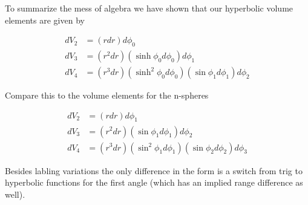 \documentclass{article}
\begin{document}
To summarize the mess of algebra we have shown that our hyperbolic volume elements are given by

\begin{align}
dV_2 &= \left(r dr\right) d\phi_0 \\
dV_3 &= \left(r^2 dr\right) \left(\sinh\phi_0 d\phi_0\right) d\phi_1 \\
dV_4 &= \left(r^3 dr\right) \left(\sinh^2 \phi_0 d\phi_0\right) \left(\sin\phi_1 d\phi_1\right) d\phi_2
\end{align}

Compare this to the volume elements for the n-spheres

\begin{align}
dV_2 &= \left(r dr\right) d\phi_1 \\
dV_3 &= \left(r^2 dr\right) \left(\sin\phi_1 d\phi_1\right) d\phi_2 \\
dV_4 &= \left(r^3 dr\right) \left(\sin^2\phi_1 d\phi_1\right) \left(\sin\phi_2 d\phi_2\right) d\phi_3 
\end{align}

Besides labling variations the only difference in the form is a switch from trig to hyperbolic functions for the first angle (which has an implied
range difference as well).



\end{document}
